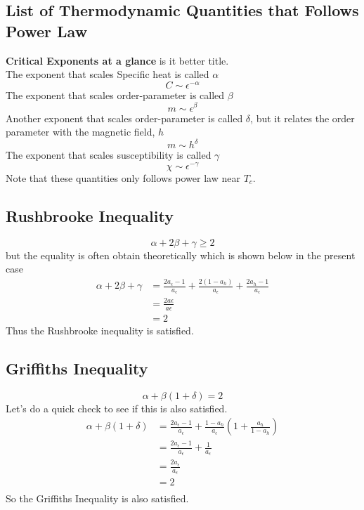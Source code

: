 	\subsection{List of Thermodynamic Quantities that Follows Power Law}
	\textbf{Critical Exponents at a glance} is it better title.\\
		The exponent that scales Specific heat is called $\alpha$ 
		\begin{equation}
			C \sim \epsilon^{-\alpha}
		\end{equation}
		The exponent that scales order-parameter is called $\beta$ 
		\begin{equation}
			m \sim \epsilon^{\beta}
		\end{equation}
		Another exponent that scales order-parameter is called $\delta$, but it relates the order parameter with the magnetic field, $h$
		\begin{equation}
			m \sim h^{\delta}
		\end{equation}
		The exponent that scales susceptibility is called $\gamma$ 
		\begin{equation}
			\chi \sim \epsilon^{-\gamma}
		\end{equation}
		Note that these quantities only follows power law near $T_c$.
	\subsection{Rushbrooke Inequality}
		\begin{equation}
			\alpha + 2 \beta + \gamma \ge 2
		\end{equation}
		but the equality is often obtain theoretically which is shown below in the present case 
		\begin{align}
			\alpha + 2\beta + \gamma &= \frac{2 a_\epsilon -1}{a_\epsilon} 
					+ \frac{2 (1 - a_h)}{a_\epsilon}
					+ \frac{2 a_h - 1}{a_\epsilon} \nonumber \\
					&= \frac{2 a\epsilon}{a\epsilon} \nonumber \\
					&= 2 \nonumber
		\end{align}
	Thus the Rushbrooke inequality is satisfied.
	\subsection{Griffiths Inequality}
	\begin{equation}
		\alpha + \beta (1+\delta)  = 2
	\end{equation}
	Let's do a quick check to see if this is also satisfied.
	\begin{align}
		\alpha + \beta (1+\delta) &= \frac{2 a_\epsilon - 1}{a_\epsilon} 
									+ \frac{1 - a_h}{a_\epsilon} \left(1 + \frac{a_h}{1 - a_h}\right) \nonumber \\
								  &= \frac{2 a_\epsilon - 1}{a_\epsilon}  + \frac{1}{a_\epsilon} \nonumber \\
								  &= \frac{2 a_\epsilon}{a_\epsilon} \nonumber \\
								  &= 2 \nonumber \\
	\end{align}
	So the Griffiths Inequality is also satisfied. 
